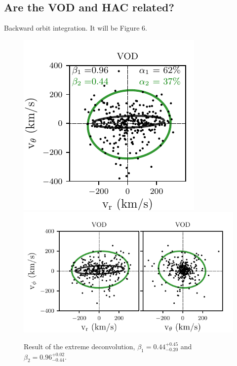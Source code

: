 \documentclass[fleqn,usenatbib]{mnras}
\begin{document}
\subsection{Are the VOD and HAC related?}
Backward orbit integration. It will be Figure 6.

\begin{figure}
    \includegraphics[scale=0.545]{VOD_velocities_vphi_gm2.pdf}
    \includegraphics[scale=0.545]{VOD_velocities_vtheta_gm2.pdf} 
   \caption{Result of the extreme deconvolution, $\beta_{1}=0.44^{+0.45}_{-0.20}$ and $\beta_{2}= 0.96^{+0.02}_{-0.44}$. }
    \label{fig:xd}
\end{figure}
\end{document}
